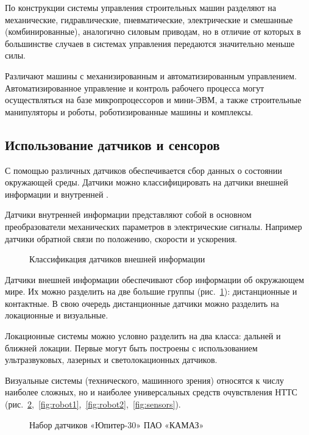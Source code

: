 По конструкции системы управления строительных машин разделяют на механические, гидравлические, пневматические, электрические и смешанные (комбинированные), аналогично силовым приводам, но в отличие от которых в большинстве случаев в системах управления передаются значительно меньше силы.

Различают машины с механизированным и автоматизированным управлением. Автоматизированное управление и контроль рабочего процесса могут осуществляться на базе микропроцессоров и мини-ЭВМ, а также строительные манипуляторы и роботы, роботизированные машины и комплексы.

\subsection{Использование датчиков и сенсоров}\label{subsec:ch1/sec2/sub2}

С помощью различных датчиков обеспечивается сбор данных о состоянии окружающей среды. Датчики можно классифицировать на датчики внешней информации и внутренней \cite[с.~131]{Vlasov}. 

Датчики внутренней информации представляют собой в основном преобразователи механических параметров в электрические сигналы. Например датчики обратной связи по положению, скорости и ускорения.

\begin{figure}[ht]
    \caption{Классификация датчиков внешней информации}\label{fig:datchiki}
\end{figure}

Датчики внешней информации обеспечивают сбор информации об окружающем мире. Их можно разделить на две большие группы (рис.~\cref{fig:datchiki}): дистанционные и контактные. В свою очередь дистанционные датчики можно разделить на локационные и визуальные.

Локационные системы можно условно разделить на два класса: дальней и ближней локации. Первые могут быть построены с использованием ультразвуковых, лазерных и светолокационных датчиков.

Визуальные системы (технического, машинного зрения) относятся к числу наиболее сложных, но и наиболее универсальных средств очувствления НТТС (рис.~\cref{fig:kamaz},~\cref{fig:robot1},~\cref{fig:robot2},~\cref{fig:sensors}).

\begin{figure}[ht]
    \caption{Набор датчиков «Юпитер-30» ПАО «КАМАЗ»}\label{fig:kamaz}
\end{figure}

